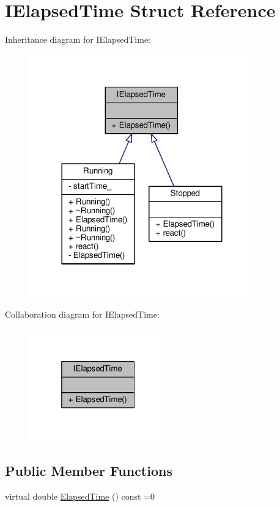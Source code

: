 \hypertarget{struct_i_elapsed_time}{}\section{I\+Elapsed\+Time Struct Reference}
\label{struct_i_elapsed_time}


Inheritance diagram for I\+Elapsed\+Time\+:
\nopagebreak
\begin{figure}[H]
\begin{center}
\leavevmode
\includegraphics[width=276pt]{struct_i_elapsed_time__inherit__graph}
\end{center}
\end{figure}


Collaboration diagram for I\+Elapsed\+Time\+:
\nopagebreak
\begin{figure}[H]
\begin{center}
\leavevmode
\includegraphics[width=169pt]{struct_i_elapsed_time__coll__graph}
\end{center}
\end{figure}
\subsection*{Public Member Functions}
\begin{DoxyCompactItemize}
\item 
virtual double \mbox{\hyperlink{struct_i_elapsed_time_a11995710009caacf4343d6d0f79da4ce}{Elapsed\+Time}} () const =0
\end{DoxyCompactItemize}


